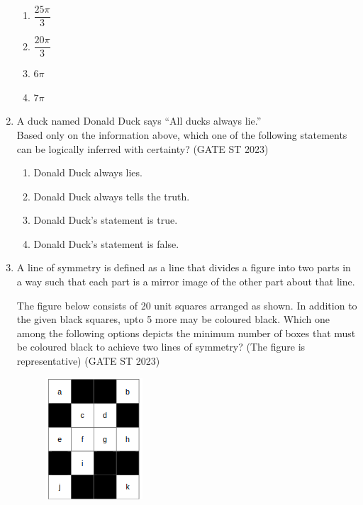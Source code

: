\documentclass[journal]{IEEEtran}
\begin{document}
\begin{enumerate}[label=\textbf{Q.\arabic*.}, start=1, align=left, itemsep=2em]
\begin{enumerate}
    \item  $\dfrac{25\pi}{3}$
    \item  $\dfrac{20\pi}{3}$
    \item  $6\pi$
    \item  $7\pi$
\end{enumerate}
   

\item A duck named Donald Duck says ``All ducks always lie.''\\
Based only on the information above, which one of the following statements can be logically inferred with certainty? 
\hspace*{15.7cm}(GATE ST 2023)
\begin{enumerate}
    \item Donald Duck always lies.
    \item Donald Duck always tells the truth.
    \item Donald Duck's statement is true.
    \item Donald Duck's statement is false.
\end{enumerate}

\item A line of symmetry is defined as a line that divides a figure into two parts in a way such that each part is a mirror image of the other part about that line.

The figure below consists of 20 unit squares arranged as shown. In addition to the given black squares, upto 5 more may be coloured black. Which one among the following options depicts the minimum number of boxes that must be coloured black to achieve two lines of symmetry? (The figure is representative) \hfill(GATE ST 2023)

    \begin{figure}[H]
        \centering
        \includegraphics[width=0.5\columnwidth]{figs/Q.5image.png}
        \caption{}
        \label{fig:placeholder}
    \end{figure}
   

\end{enumerate}
\end{document}
